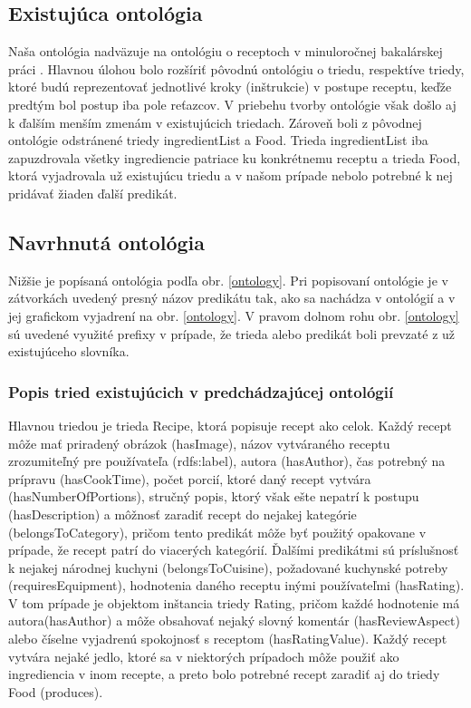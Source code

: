 \subsection{Existujúca ontológia}
	Naša ontológia nadväzuje na ontológiu o receptoch v minuloročnej bakalárskej práci \cite{bakalarka}. Hlavnou úlohou bolo rozšíriť pôvodnú ontológiu o triedu, respektíve triedy, ktoré budú reprezentovať jednotlivé kroky (inštrukcie) v postupe receptu, keďže predtým bol postup iba pole reťazcov. V priebehu tvorby ontológie však došlo aj k ďalším menším zmenám v existujúcich triedach. Zároveň boli z pôvodnej ontológie odstránené triedy ingredientList a Food. Trieda ingredientList iba zapuzdrovala všetky ingrediencie patriace ku konkrétnemu receptu a trieda Food, ktorá vyjadrovala už existujúcu triedu a v našom prípade nebolo potrebné k nej pridávať žiaden ďalší predikát.
	
\subsection{Navrhnutá ontológia}
Nižšie je popísaná ontológia podľa obr. \ref{ontology}. Pri popisovaní ontológie je v zátvorkách uvedený presný názov predikátu tak, ako sa nachádza v ontológií a v jej grafickom vyjadrení na obr. \ref{ontology}. V pravom dolnom rohu obr. \ref{ontology} sú uvedené využité prefixy v prípade, že trieda alebo predikát boli prevzaté z už existujúceho slovníka. 
	
\subsubsection{Popis tried existujúcich v predchádzajúcej ontológií}
	Hlavnou triedou je trieda Recipe, ktorá popisuje recept ako celok. Každý recept môže mať priradený obrázok (hasImage), názov vytváraného receptu zrozumiteľný pre používateľa (rdfs:label), autora (hasAuthor), čas potrebný na prípravu (hasCookTime), počet porcií, ktoré daný recept vytvára (hasNumberOfPortions), stručný popis, ktorý však ešte nepatrí k postupu (hasDescription) a môžnosť zaradiť recept do nejakej kategórie (belongsToCategory), pričom tento predikát môže byť použitý opakovane v prípade, že recept patrí do viacerých kategórií. Ďalšími predikátmi sú príslušnosť k nejakej národnej kuchyni (belongsToCuisine), požadované kuchynské potreby (requiresEquipment), hodnotenia daného receptu inými používateľmi (hasRating). V tom prípade je objektom inštancia triedy Rating, pričom každé hodnotenie má autora(hasAuthor) a môže obsahovať nejaký slovný komentár (hasReviewAspect) alebo číselne vyjadrenú spokojnosť s receptom (hasRatingValue). Každý recept vytvára nejaké jedlo, ktoré sa v niektorých prípadoch môže použiť ako ingrediencia v inom recepte, a preto bolo potrebné recept zaradiť aj do triedy Food (produces).
	
